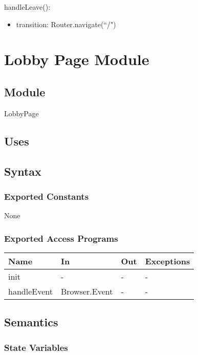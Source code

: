 \documentclass[12pt, titlepage]{article}
\begin{document}
\noindent handleLeave():
\begin{itemize}
\item transition: Router.navigate(``/")
\end{itemize}

\newpage

\section{Lobby Page Module} \label{LobbyPage}

\subsection{Module}
LobbyPage

\subsection{Uses}

\subsection{Syntax}

\subsubsection{Exported Constants}
None

\subsubsection{Exported Access Programs}

\begin{center}
\begin{tabular}{p{2cm} p{2cm} p{2cm} p{5cm}}
\hline
\textbf{Name} & \textbf{In} & \textbf{Out} & \textbf{Exceptions} \\
\hline
init & - & - & - \\
handleEvent & Browser.Event & - & -\\
\hline
\end{tabular}
\end{center}

\subsection{Semantics}

\subsubsection{State Variables}
\end{document}
